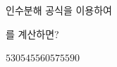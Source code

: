 인수분해 공식을 이용하여\par{}\noindent 를 계산하면?
\begin{choices32}{$530$}{$545$}{$560$}{$575$}{$590$}\end{choices32}
